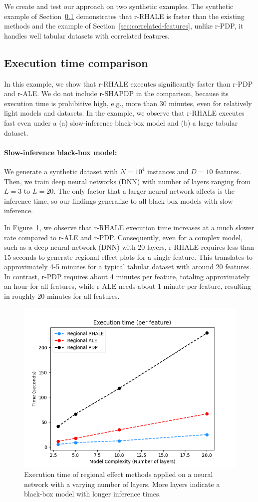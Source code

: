 \documentclass[
twocolumn,
]{ceurart}
\begin{document}
We create and test our approach on two synthetic examples. The synthetic example of Section~\ref{sec:efficiency} demonstrates that r-RHALE is faster than the existing methods and the example of Section~\ref{sec:correlated-features}, unlike r-PDP, it handles well tabular datasets with correlated features.

\subsection{Execution time comparison}
\label{sec:efficiency}


In this example, we show that r-RHALE executes significantly faster than r-PDP and r-ALE.
We do not include r-SHAPDP in the comparison, because its execution time is prohibitive high, e.g., more than 30 minutes, even for relatively light models and datasets. In the example, we observe that r-RHALE executes fast even under a (a) slow-inference black-box model and (b) a large tabular dataset.

\paragraph{Slow-inference black-box model:}

We generate a synthetic dataset with $N=10^4$ instances and $D=10$ features. Then, we train deep neural networks (DNN) with number of layers ranging from $L=3$ to $L=20$. The only factor that a larger neural network affects is the inference time, so our findings generalize to all black-box models with slow inference.

In Figure~\ref{fig:efficiency_heavy_model}, we observe that r-RHALE execution time increases at a much slower rate compared to r-ALE and r-PDP. Consequently, even for a complex model, such as a deep neural network (DNN) with 20 layers, r-RHALE requires less than 15 seconds to generate regional effect plots for a single feature. This translates to approximately 4-5 minutes for a typical tabular dataset with around 20 features. In contrast, r-PDP requires about 4 minutes per feature, totaling approximately an hour for all features, while r-ALE needs about 1 minute per feature, resulting in roughly 20 minutes for all features.

\begin{figure}
    \centering
    \includegraphics[width=.49\textwidth]{figures/simulation_2/efficiency_layers.png}
    \caption{Execution time of regional effect methods applied on a neural network with a varying number of layers. More layers indicate a black-box model with longer inference times.}
    \label{fig:efficiency_heavy_model}
\end{figure}
\end{document}
